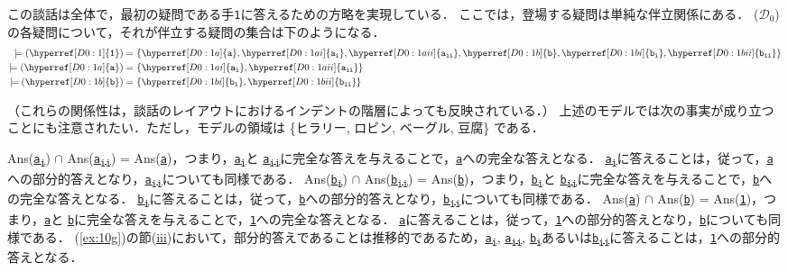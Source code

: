 \documentclass{goken}
\newcommand{\disref}[2]{\hyperref[#1]{\texttt{#2}}}
\newcommand{\disrefsub}[3]{\hyperref[#1]{\texttt{#2\textsubscript{#3}}}}
\newcommand{\ori}[1]{\noindent\textcolor[gray]{0.7}{\fontsize{8pt}{8pt}\selectfont{\textsf{(p.~#1)}}} }
\begin{document}
\noindent
この談話は全体で，最初の疑問である手\texttt{1}に答えるための方略を実現している．
ここでは，登場する疑問は単純な伴立関係にある．
(\hyperref[D0]{$\mathcal{D}_0$})の各疑問について，それが伴立する疑問の集合は\mbox{下のようになる．}
%
\begin{align*}
	\models (\disref{D0:1}{1}) =&\ \{\disref{D0:1a}{a}, \disrefsub{D0:1ai}{a}{i}, \disrefsub{D0:1aii}{a}{ii}, \disref{D0:1b}{b}, \disrefsub{D0:1bi}{b}{i}, \disrefsub{D0:1bii}{b}{ii}\} \\
	\models (\disref{D0:1a}{a}) =&\ \{\disrefsub{D0:1ai}{a}{i}, \disrefsub{D0:1aii}{a}{ii}\}\\
	\models (\disref{D0:1b}{b}) =&\ \{\disrefsub{D0:1bi}{b}{i}, \disrefsub{D0:1bii}{b}{ii}\}
\end{align*}

\noindent
（これらの関係性は，談話のレイアウトにおけるインデントの階層によっても反映されている．）
上述のモデルでは次の事実が成り立つことにも注意されたい．ただし，モデルの領域は \{ヒラリー, ロビン, ベーグル, 豆腐\} である．

\ori{17}
\begin{exe}
	\ex \label{ex:11}
	\begin{xlist}
		\ex Ans(\disrefsub{D0:1ai}{a}{i}) $\cap$ Ans(\disrefsub{D0:1aii}{a}{ii}) = Ans(\disref{D0:1a}{a})，つまり，\disrefsub{D0:1ai}{a}{i}と \disrefsub{D0:1aii}{a}{ii}に完全な答えを与えることで，\disref{D0:1a}{a}への完全な答えとなる．
				\disrefsub{D0:1ai}{a}{i}に答えることは，従って，\disref{D0:1a}{a}への部分的答えとなり，\disrefsub{D0:1aii}{a}{ii}についても同様である．
		\ex Ans(\disrefsub{D0:1bi}{b}{i}) $\cap$ Ans(\disrefsub{D0:1bii}{b}{ii}) = Ans(\disref{D0:1b}{b})，つまり，\disrefsub{D0:1bi}{b}{i}と \disrefsub{D0:1bii}{b}{ii}に完全な答えを与えることで，\disref{D0:1b}{b}への完全な答えとなる．
				\disrefsub{D0:1bi}{b}{i}に答えることは，従って，\disref{D0:1b}{b}への部分的答えとなり，\disrefsub{D0:1bii}{b}{ii}についても同様である．
		\ex Ans(\disref{D0:1a}{a}) $\cap$ Ans(\disref{D0:1b}{b}) = Ans(\disref{D0:1}{1})，つまり，\disref{D0:1a}{a}と \disref{D0:1b}{b}に完全な答えを与えることで，\disref{D0:1}{1}への完全な答えとなる．
				\disref{D0:1a}{a}に答えることは，従って，\disref{D0:1}{1}への部分的答えとなり，\disref{D0:1b}{b}についても同様である．
		\ex (\ref{ex:10g})の節(\hyperref[ex:10giii]{iii})において，部分的答えであることは推移的であるため，\disrefsub{D0:1ai}{a}{i}, \disrefsub{D0:1aii}{a}{ii}, \disrefsub{D0:1bi}{b}{i}あるいは\disrefsub{D0:1bii}{b}{ii}に答えることは，\disref{D0:1}{1}への部分的答えとなる．
	\end{xlist}
\end{exe}
\end{document}
